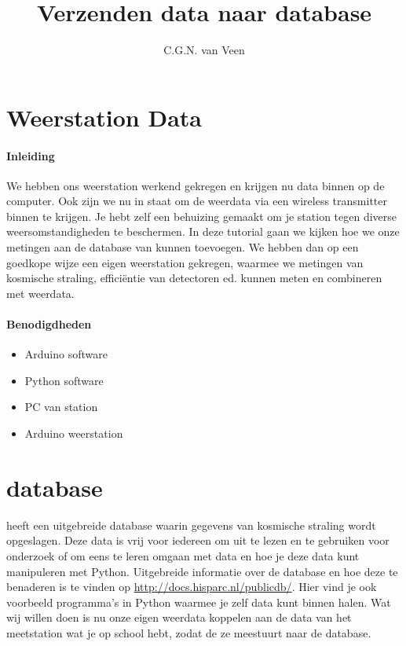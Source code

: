 

\title{Verzenden data naar \hisparc database}
\author{C.G.N. van Veen}



\maketitle

\section{Weerstation Data}

\paragraph{Inleiding} We hebben ons weerstation werkend gekregen en krijgen nu 
data binnen op de computer. Ook zijn we nu in staat om de weerdata via een wireless
transmitter binnen te krijgen. Je hebt zelf een behuizing gemaakt om je station
tegen diverse weersomstandigheden te beschermen. In deze tutorial gaan we kijken
hoe we onze metingen aan de database van \hisparc kunnen toevoegen. 
We hebben dan op een goedkope wijze een eigen weerstation gekregen, waarmee
we metingen van kosmische straling, efficiëntie van detectoren ed. kunnen meten en 
combineren met weerdata. 

\paragraph{Benodigdheden}

\begin{itemize}  
    \item Arduino software
    \item Python software
    \item PC van \hisparc station
    \item Arduino weerstation
    
\end{itemize}

\section{\hisparc database}

\hisparc heeft een uitgebreide database waarin gegevens van kosmische straling
wordt opgeslagen. Deze data is vrij voor iedereen om uit te lezen en te gebruiken
voor onderzoek of om eens te leren omgaan met data en hoe je deze data kunt manipuleren met Python.
Uitgebreide informatie over de \hisparc database en hoe deze te benaderen is te 
vinden op \url{http://docs.hisparc.nl/publicdb/}. Hier vind je ook voorbeeld
programma's in Python waarmee je zelf data kunt binnen halen.
Wat wij willen doen is nu onze eigen weerdata koppelen aan de data van het meetstation
wat je op school hebt, zodat de \daq ze meestuurt naar de database.


